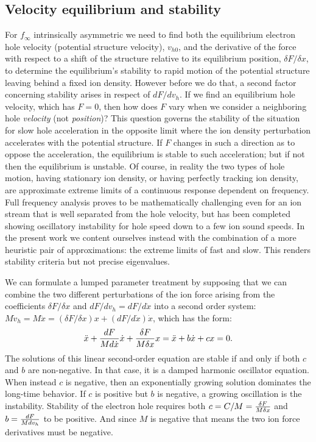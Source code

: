 \documentclass[pre]{revtex4-2}
\begin{document}
\subsection{Velocity equilibrium and stability}
\label{3.2}

For $f_\infty$ intrinsically asymmetric we need to find both the
equilibrium electron hole velocity (potential structure velocity),
$v_{h0}$, and the derivative of the force with respect to a shift of
the structure relative to its equilibrium position,
$\delta F/\delta x$, to determine the equilibrium's stability to rapid
motion of the potential structure leaving behind a fixed ion
density. However before we do that, a second factor concerning
stability arises in respect of $dF/dv_h$. If we find an equilibrium
hole velocity, which has $F=0$, then how does $F$ vary when we
consider a neighboring hole \emph{velocity} (not \emph{position})?
This question governs the stability of the situation for slow hole
acceleration in the opposite limit where the ion density perturbation
accelerates with the potential structure. If $F$ changes in such a
direction as to oppose the acceleration, the equilibrium is stable to
such acceleration; but if not then the equilibrium is unstable. Of
course, in reality the two types of hole motion, having stationary ion
density, or having perfectly tracking ion density, are approximate
extreme limits of a continuous response dependent on frequency. Full
frequency analysis proves to be mathematically challenging even for an
ion stream that is well separated from the hole velocity, but has been
completed showing oscillatory instability for hole speed down to a few
ion sound speeds\cite{Zhou2017}.  In the present work we content
ourselves instead with the combination of a more heuristic pair of
approximations: the extreme limits of fast and slow. This renders
stability criteria but not precise eigenvalues.


We can formulate a lumped parameter treatment by supposing that we
can combine the two different perturbations of the ion force arising from
the coefficients $\delta F/\delta x$ and $dF/dv_h=dF/d\dot x$ into a
second order system:
$M\dot v_h= M\ddot x = (\delta F/\delta x) x + (dF/d\dot x) \dot x$,
which has the form:
\begin{equation}
  \label{eq:harmosc}
  \ddot x +{dF\over Md\dot x}\dot x+{\delta F\over M\delta x} x= \ddot x+
   b\dot x + c x=0.
\end{equation}
The solutions of this linear second-order equation are stable if and
only if both $c$ and $b$ are non-negative. In that case, it is a damped
harmonic oscillator equation. When instead $c$ is negative, then an
exponentially growing solution dominates the long-time behavior. If
$c$ is positive but $b$ is negative, a growing oscillation is the
instability. Stability of the electron hole requires both $c=C/M={\delta
  F\over M\delta x}$ and $b={dF\over Md v_h}$ to be positive. And
since $M$ is negative that means the two ion force derivatives must be
negative. 
\end{document}
